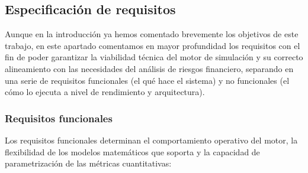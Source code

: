 \documentclass[11pt]{article}
\begin{document}
\subsection{Especificación de requisitos}

Aunque en la introducción ya hemos comentado brevemente los objetivos de este trabajo, en este apartado comentamos en mayor profundidad los requisitos con el fin de poder garantizar la viabilidad técnica del motor de simulación y su correcto alineamiento con las necesidades del análisis de riesgos financiero, separando en una serie de requisitos funcionales (el qué hace el sistema) y no funcionales (el cómo lo ejecuta a nivel de rendimiento y arquitectura).

\subsubsection{Requisitos funcionales}

Los requisitos funcionales determinan el comportamiento operativo del motor, la flexibilidad de los modelos matemáticos que soporta y la capacidad de parametrización de las métricas cuantitativas:
\end{document}
